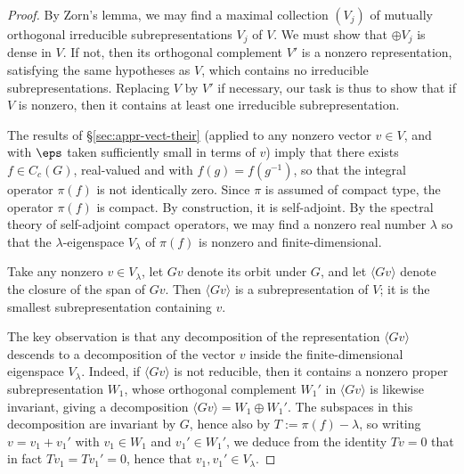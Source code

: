 \documentclass[reqno]{amsart} 
\begin{document}
\begin{proof}
  By Zorn's lemma, we may find a maximal collection $(V_j)$ of mutually orthogonal irreducible subrepresentations $V_j$ of $V$.  We must show that $\oplus V_j$ is dense in $V$.  If not, then its orthogonal complement $V'$ is a nonzero representation, satisfying the same hypotheses as $V$, which contains no irreducible subrepresentations.  Replacing $V$ by $V'$ if necessary, our task is thus to show that if $V$ is nonzero, then it contains at least one irreducible subrepresentation.
  
  The results of \S\ref{sec:appr-vect-their} (applied to any nonzero vector $v \in V$, and with $\eps$ taken sufficiently small in terms of $v$) imply that there exists $f \in C_c(G)$, real-valued and with $f(g) = f(g^{-1})$, so that the integral operator $\pi(f)$ is not identically zero.  Since $\pi$ is assumed of compact type, the operator $\pi(f)$ is compact.  By construction, it is self-adjoint.  By the spectral theory of self-adjoint compact operators, we may find a nonzero real number $\lambda$ so that the $\lambda$-eigenspace $V_\lambda$ of $\pi(f)$ is nonzero and finite-dimensional.
  
  Take any nonzero $v \in V_\lambda$, let $G v$ denote its orbit under $G$, and let $\langle G v \rangle$ denote the closure of the span of $G v$.  Then $\langle G v \rangle$ is a subrepresentation of $V$; it is the smallest subrepresentation containing $v$.

  The key observation is that any decomposition of the representation $\langle G v \rangle$ descends to a decomposition of the vector $v$ inside the finite-dimensional eigenspace $V_\lambda$.  Indeed, if $\langle G v \rangle$ is not reducible, then it contains a nonzero proper subrepresentation $W_1$, whose orthogonal complement $W_1'$ in $\langle G v \rangle$ is likewise invariant, giving a decomposition $\langle G v \rangle = W_1 \oplus W_1'$.  The subspaces in this decomposition are invariant by $G$, hence also by $T := \pi(f) - \lambda$, so writing $v = v_1 + v_1'$ with $v_1 \in W_1$ and $v_1' \in W_1'$, we deduce from the identity $T v = 0$ that in fact $T v_1 = T v_1' = 0$, hence that $v_1, v_1' \in V_\lambda$.


\end{proof}
\end{document}

